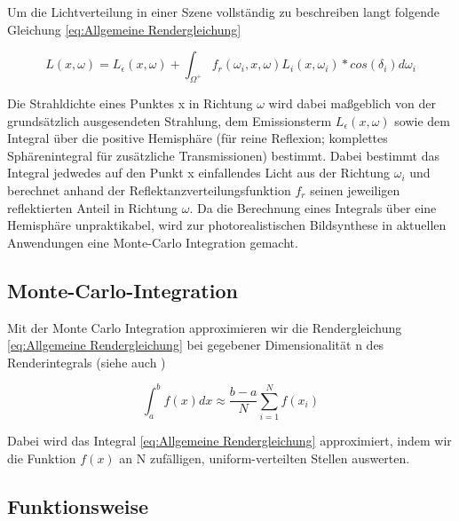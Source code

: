 Um die Lichtverteilung in einer Szene vollständig zu beschreiben langt folgende Gleichung \ref{eq:Allgemeine Rendergleichung} \cite{kajiya1986rendering}

\begin{tcolorbox}[rightrule=3mm, rounded corners=east]
    \begin{equation}\label{eq:Allgemeine Rendergleichung}
        L(x,\omega) = L_{\epsilon}(x,\omega) + \int_{\Omega^{+}}f_{r}(\omega_{i},x,\omega)L_{i}(x,\omega_{i})*cos(\delta_{i})d\omega_{i}
    \end{equation}
\end{tcolorbox}

Die Strahldichte eines Punktes x in Richtung $\omega$ wird dabei maßgeblich von der grundsätzlich ausgesendeten Strahlung, dem Emissionsterm 
$L_{\epsilon}(x,\omega)$ sowie dem Integral über die positive Hemisphäre (für reine Reflexion; komplettes Sphärenintegral für zusätzliche 
Transmissionen) bestimmt. Dabei bestimmt das Integral jedwedes auf den Punkt x einfallendes Licht aus der Richtung $\omega_{i}$ und berechnet 
anhand der Reflektanzverteilungsfunktion $f_{r}$ seinen jeweiligen reflektierten Anteil in Richtung $\omega$. Da die Berechnung eines Integrals
über eine Hemisphäre unpraktikabel, wird zur photorealistischen Bildsynthese in aktuellen Anwendungen \cite{PathTracingInProduction} eine 
Monte-Carlo Integration gemacht.

\subsection{Monte-Carlo-Integration}
Mit der Monte Carlo Integration approximieren wir die Rendergleichung \ref{eq:Allgemeine Rendergleichung} bei gegebener Dimensionalität n des Renderintegrals 
(siehe auch \cite{KK02})

\begin{tcolorbox}[rightrule=3mm, rounded corners=east]
    \begin{equation}\label{eq:Monte-Carlo}
        \int_{a}^{b}f(x)dx \approx \frac{b-a}{N}\sum_{i=1}^{N}f(x_{i})
    \end{equation}
\end{tcolorbox}

Dabei wird das Integral \ref{eq:Allgemeine Rendergleichung} approximiert, indem wir die Funktion $f(x)$ an N zufälligen, uniform-verteilten
Stellen auswerten. 

\subsection{Funktionsweise}

